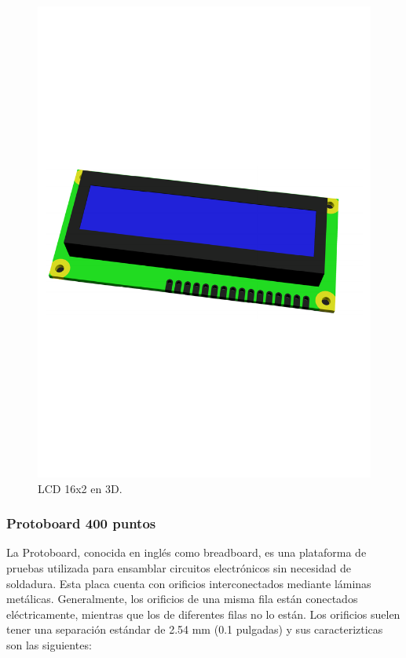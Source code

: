     \begin{figure}[H]
        \centering
        \includegraphics[scale=0.4]{15/img/lcdModelo.pdf}
        \caption{LCD 16x2 en 3D.}
        \label{fig:lcdModelo}
    \end{figure}
    
    \subsubsection{Protoboard 400 puntos}
    La Protoboard, conocida en inglés como breadboard, es una plataforma de pruebas utilizada para ensamblar circuitos electrónicos sin necesidad de soldadura. Esta placa cuenta con orificios interconectados mediante láminas metálicas. Generalmente, los orificios de una misma fila están conectados eléctricamente, mientras que los de diferentes filas no lo están. Los orificios suelen tener una separación estándar de 2.54 mm (0.1 pulgadas) y sus caracterizticas son las siguientes:
    

